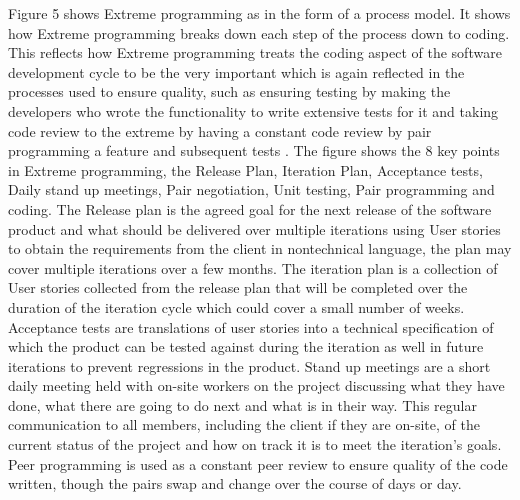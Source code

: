 \documentclass{style/CRPITStyle}
\renewcommand{\cite}{\citep}
\begin{document}
Figure 5 shows Extreme programming as in the form of a process model.
It shows how Extreme programming breaks down each step of the process down to
coding. This reflects how Extreme programming treats the coding aspect of
the software development cycle to be the very important which is again reflected 
in the processes used to ensure quality, such as ensuring testing by making the
developers who wrote the functionality to write extensive tests for it and
taking code review to the extreme by having a constant code review by pair
programming a feature and subsequent tests \cite{beck:2000:xp}.
The figure shows the 8 key points in Extreme programming, the Release Plan,
Iteration Plan, Acceptance tests, Daily stand up meetings, Pair negotiation,
Unit testing, Pair programming and coding.  
The Release plan is the agreed goal for the next release of the software 
product and what should be delivered over multiple iterations using User 
stories to obtain the requirements from the client in nontechnical language, the
plan may cover multiple iterations over a few months.
The iteration plan is a collection of User stories collected from the release
plan that will be completed over the duration of the iteration cycle which could
cover a small number of weeks.
Acceptance tests are translations of user stories into a technical specification
of which the product can be tested against during the iteration as well in
future iterations to prevent regressions in the product.
Stand up meetings are a short daily meeting held with on-site workers on the project
discussing what they have done, what there are going to do next and what is in
their way. This regular communication to all members, including the client if 
they are on-site, of the current status of the project and how on track it is to
meet the iteration's goals. Peer programming is used as a constant peer review
to ensure quality of the code written, though the pairs swap and change over the
course of days or day.
\end{document}
